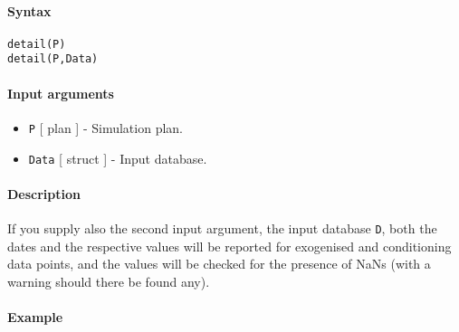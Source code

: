 


	\paragraph{Syntax}

\begin{verbatim}
detail(P)
detail(P,Data)
\end{verbatim}

\paragraph{Input arguments}

\begin{itemize}
\item
  \texttt{P} {[} plan {]} - Simulation plan.
\item
  \texttt{Data} {[} struct {]} - Input database.
\end{itemize}

\paragraph{Description}

If you supply also the second input argument, the input database
\texttt{D}, both the dates and the respective values will be reported
for exogenised and conditioning data points, and the values will be
checked for the presence of NaNs (with a warning should there be found
any).

\paragraph{Example}


